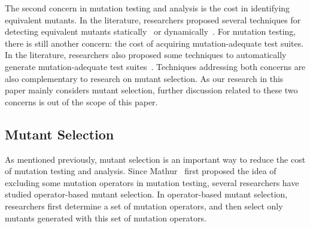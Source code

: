 The second concern in mutation testing and analysis is the cost in
identifying equivalent mutants. In the literature, researchers
proposed several techniques for detecting equivalent mutants
statically~\cite{Offutt:94,Offutt:97,Hierons:99} or
dynamically~\cite{Grun:09,Schuler:09}. For mutation testing, there
is still another concern: the cost of acquiring mutation-adequate
test suites. In the literature, researchers also proposed some
techniques to automatically generate mutation-adequate test
suites~\cite{DeMillo:91b,Offutt:99,Liu:06}. Techniques addressing
both concerns are also complementary to research on mutant
selection. As our research in this paper mainly considers mutant
selection, further discussion related to these two concerns is out
of the scope of this paper.

\vspace{-1ex}
\subsection{Mutant Selection}
\label{RelatedSelection}

As mentioned previously, mutant selection is an important way to
reduce the cost of mutation testing and analysis. Since
Mathur~\cite{Mathur:91} first proposed the idea of excluding some
mutation operators in mutation testing, several researchers have
studied operator-based mutant selection. In operator-based mutant
selection, researchers first determine a set of mutation
operators, and then select only mutants generated with this set of
mutation operators.

